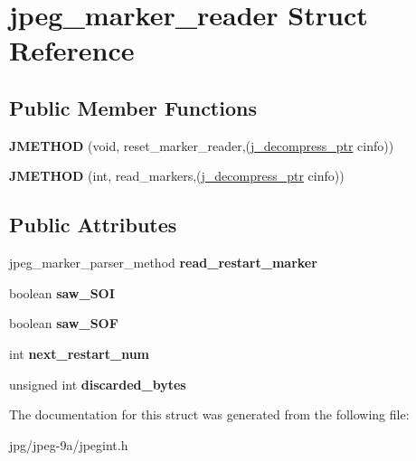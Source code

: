 \hypertarget{structjpeg__marker__reader}{\section{jpeg\+\_\+marker\+\_\+reader Struct Reference}
\label{structjpeg__marker__reader}
}
\subsection*{Public Member Functions}
\begin{DoxyCompactItemize}
\item 
\hypertarget{structjpeg__marker__reader_af23250da87f9da190c88459aa565f2b1}{{\bfseries J\+M\+E\+T\+H\+O\+D} (void, reset\+\_\+marker\+\_\+reader,(\hyperlink{structjpeg__decompress__struct}{j\+\_\+decompress\+\_\+ptr} cinfo))}\label{structjpeg__marker__reader_af23250da87f9da190c88459aa565f2b1}

\item 
\hypertarget{structjpeg__marker__reader_a6a2541cbeb37477c71ba6bc237e559a1}{{\bfseries J\+M\+E\+T\+H\+O\+D} (int, read\+\_\+markers,(\hyperlink{structjpeg__decompress__struct}{j\+\_\+decompress\+\_\+ptr} cinfo))}\label{structjpeg__marker__reader_a6a2541cbeb37477c71ba6bc237e559a1}

\end{DoxyCompactItemize}
\subsection*{Public Attributes}
\begin{DoxyCompactItemize}
\item 
\hypertarget{structjpeg__marker__reader_a23e67f5a0fa37ea69483dad72217123e}{jpeg\+\_\+marker\+\_\+parser\+\_\+method {\bfseries read\+\_\+restart\+\_\+marker}}\label{structjpeg__marker__reader_a23e67f5a0fa37ea69483dad72217123e}

\item 
\hypertarget{structjpeg__marker__reader_ad67711d91054e97e76fbe5254aac644c}{boolean {\bfseries saw\+\_\+\+S\+O\+I}}\label{structjpeg__marker__reader_ad67711d91054e97e76fbe5254aac644c}

\item 
\hypertarget{structjpeg__marker__reader_a1bf77ef7dfb6dfe58a03d041eb0dcd40}{boolean {\bfseries saw\+\_\+\+S\+O\+F}}\label{structjpeg__marker__reader_a1bf77ef7dfb6dfe58a03d041eb0dcd40}

\item 
\hypertarget{structjpeg__marker__reader_aac8d40171c73a18f129cd1b62d2fd06b}{int {\bfseries next\+\_\+restart\+\_\+num}}\label{structjpeg__marker__reader_aac8d40171c73a18f129cd1b62d2fd06b}

\item 
\hypertarget{structjpeg__marker__reader_ad29dee6159ab74f195fe5d88139306ce}{unsigned int {\bfseries discarded\+\_\+bytes}}\label{structjpeg__marker__reader_ad29dee6159ab74f195fe5d88139306ce}

\end{DoxyCompactItemize}


The documentation for this struct was generated from the following file\+:\begin{DoxyCompactItemize}
\item 
jpg/jpeg-\/9a/jpegint.\+h\end{DoxyCompactItemize}
